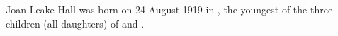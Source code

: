 
Joan Leake Hall was born on 24 August 1919 in ,\cite{JLHbirth}
the youngest of the three children (all daughters)
of  and .
